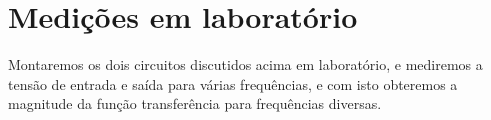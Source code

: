 \section{Medições em laboratório}


Montaremos os dois circuitos discutidos acima em laboratório, e mediremos a tensão de entrada e saída para várias frequências, e com isto obteremos a magnitude da função transferência para frequências diversas.


\newpage
